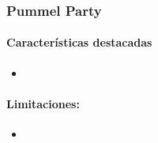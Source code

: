 \subsubsection{Pummel Party}

\paragraph{Características destacadas}
\begin{itemize}
    \item 
\end{itemize}

\paragraph{Limitaciones:}
\begin{itemize}
    \item 
\end{itemize}
